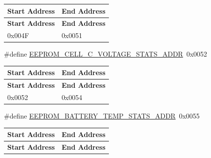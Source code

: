 \begin{DoxyCompactItemize}
\begin{DoxyCompactList}
\begin{longtabu} spread 0pt [c]{*{2}{|X[-1]}|}
\hline
\rowcolor{\tableheadbgcolor}\textbf{ Start Address}&\textbf{ End Address  }\\
\endfirsthead
\hline
\endfoot
\hline
\rowcolor{\tableheadbgcolor}\textbf{ Start Address}&\textbf{ End Address  }\\
\endhead
0x004F&0x0051 \\
\end{longtabu}
\end{DoxyCompactList}\item 
\mbox{\label{group__defines__eeprom__address__map_gaed59c9e0cd2b68c47afd39ec1954b5e6}} 
\#define \hyperlink{group__defines__eeprom__address__map_gaed59c9e0cd2b68c47afd39ec1954b5e6}{E\+E\+P\+R\+O\+M\+\_\+\+C\+E\+L\+L\+\_\+\+C\+\_\+\+V\+O\+L\+T\+A\+G\+E\+\_\+\+S\+T\+A\+T\+S\+\_\+\+A\+D\+DR}~0x0052
\begin{DoxyCompactList}\small\item\em \tabulinesep=1mm
\begin{longtabu} spread 0pt [c]{*{2}{|X[-1]}|}
\hline
\rowcolor{\tableheadbgcolor}\textbf{ Start Address}&\textbf{ End Address  }\\
\endfirsthead
\hline
\endfoot
\hline
\rowcolor{\tableheadbgcolor}\textbf{ Start Address}&\textbf{ End Address  }\\
\endhead
0x0052&0x0054 \\
\end{longtabu}
\end{DoxyCompactList}\item 
\mbox{\label{group__defines__eeprom__address__map_ga8c5548d7c7e72c9974dbc3a4e670e1cf}} 
\#define \hyperlink{group__defines__eeprom__address__map_ga8c5548d7c7e72c9974dbc3a4e670e1cf}{E\+E\+P\+R\+O\+M\+\_\+\+B\+A\+T\+T\+E\+R\+Y\+\_\+\+T\+E\+M\+P\+\_\+\+S\+T\+A\+T\+S\+\_\+\+A\+D\+DR}~0x0055
\begin{DoxyCompactList}\small\item\em \tabulinesep=1mm
\begin{longtabu} spread 0pt [c]{*{2}{|X[-1]}|}
\hline
\rowcolor{\tableheadbgcolor}\textbf{ Start Address}&\textbf{ End Address  }\\
\endfirsthead
\hline
\endfoot
\hline
\rowcolor{\tableheadbgcolor}\textbf{ Start Address}&\textbf{ End Address  }\\

\end{longtabu}
\end{DoxyCompactList}
\end{DoxyCompactItemize}

